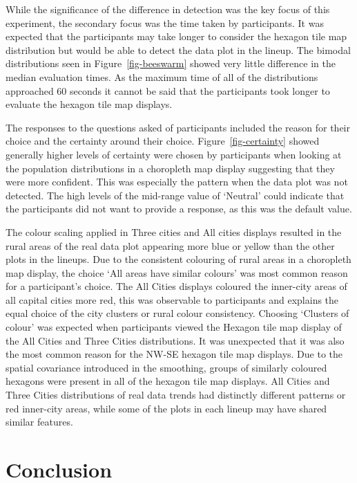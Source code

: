 \documentclass[
doublespace,
  times]{anzsauth}
\begin{document}
While the significance of the difference in detection was the key focus
of this experiment, the secondary focus was the time taken by
participants. It was expected that the participants may take longer to
consider the hexagon tile map distribution but would be able to detect
the data plot in the lineup. The bimodal distributions seen in
Figure~\ref{fig-beeswarm} showed very little difference in the median
evaluation times. As the maximum time of all of the distributions
approached 60 seconds it cannot be said that the participants took
longer to evaluate the hexagon tile map displays.

The responses to the questions asked of participants included the reason
for their choice and the certainty around their choice.
Figure~\ref{fig-certainty} showed generally higher levels of certainty
were chosen by participants when looking at the population distributions
in a choropleth map display suggesting that they were more confident.
This was especially the pattern when the data plot was not detected. The
high levels of the mid-range value of `Neutral' could indicate that the
participants did not want to provide a response, as this was the default
value.

The colour scaling applied in Three cities and All cities displays
resulted in the rural areas of the real data plot appearing more blue or
yellow than the other plots in the lineups. Due to the consistent
colouring of rural areas in a choropleth map display, the choice `All
areas have similar colours' was most common reason for a participant's
choice. The All Cities displays coloured the inner-city areas of all
capital cities more red, this was observable to participants and
explains the equal choice of the city clusters or rural colour
consistency. Choosing `Clusters of colour' was expected when
participants viewed the Hexagon tile map display of the All Cities and
Three Cities distributions. It was unexpected that it was also the most
common reason for the NW-SE hexagon tile map displays. Due to the
spatial covariance introduced in the smoothing, groups of similarly
coloured hexagons were present in all of the hexagon tile map displays.
All Cities and Three Cities distributions of real data trends had
distinctly different patterns or red inner-city areas, while some of the
plots in each lineup may have shared similar features.

\section{Conclusion}\label{conclusion}
\end{document}
